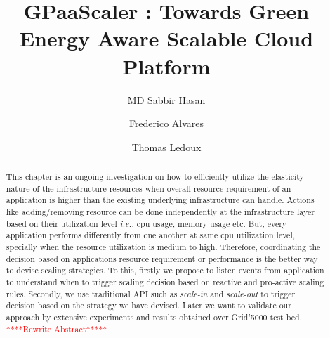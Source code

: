 \documentclass[sigconf]{acmart}
\begin{document}
\title{GPaaScaler : Towards Green Energy Aware Scalable Cloud Platform}


\author{MD Sabbir Hasan}

\author{Frederico Alvares}

\author{Thomas Ledoux}





\begin{abstract}
This chapter is an ongoing investigation on how to efficiently utilize the elasticity nature of the infrastructure resources when overall resource requirement of an application is higher than the existing underlying infrastructure can handle. Actions like adding/removing resource can be done independently at the infrastructure layer based on their utilization level \emph{i.e.,} cpu usage, memory usage etc. But, every application performs differently from one another at same cpu utilization level, specially when the resource utilization is medium to high. Therefore, coordinating the decision based on applications resource requirement or performance is the better way to devise scaling strategies. To this, firstly we propose to listen events from application to understand when to trigger scaling decision based on reactive and pro-active scaling rules. Secondly, we use traditional API such as \emph{scale-in} and \emph{scale-out} to trigger decision based on the strategy we have devised. Later we want to validate our approach by extensive experiments and results obtained over Grid'5000 test bed. \textcolor{red}{****Rewrite Abstract*****}
\end{abstract}
\end{document}
